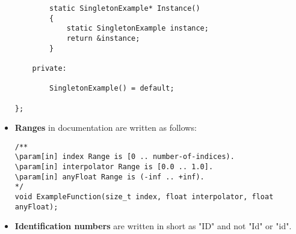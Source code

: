 \documentclass{article}
\begin{document}
\begin{itemize}
\begin{lstlisting}
		static SingletonExample* Instance()
		{
			static SingletonExample instance;
			return &instance;
		}
		
	private:
	
		SingletonExample() = default;
		
};
\end{lstlisting}

\item
\textbf{Ranges} in documentation are written as follows:

\begin{lstlisting}
/**
\param[in] index Range is [0 .. number-of-indices).
\param[in] interpolator Range is [0.0 .. 1.0].
\param[in] anyFloat Range is (-inf .. +inf).
*/
void ExampleFunction(size_t index, float interpolator, float anyFloat);
\end{lstlisting}

\item
\textbf{Identification numbers} are written in short as "ID" and not "Id" or "id".

\end{itemize}
\end{document}
